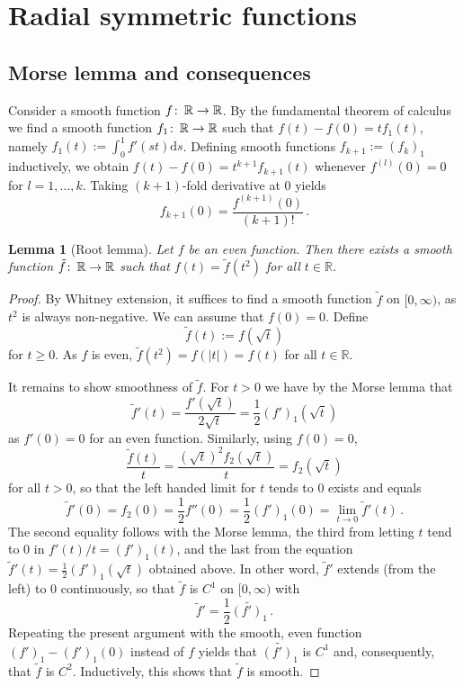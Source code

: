 \documentclass{amsart}
\newtheorem{lem}[prop]{Lemma}
\theoremstyle{definition}
\def\co{\colon\thinspace}
\newcommand{\rmd}{\mathrm d}
\newcommand{\R}{\mathbb R}
\newcommand{\ra}{\rightarrow}
\begin{document}
\section{Radial symmetric functions\label{sec:radsymmfcts}}




\subsection{Morse lemma and consequences\label{subsec:mlandcons}}


Consider a smooth function $f\co\R\ra\R$.
By the fundamental theorem of calculus
we find a smooth function $f_1\co\R\ra\R$
such that $f(t)-f(0)=tf_1(t)$,
namely $f_1(t):=\int_0^1f'(st)\rmd s$.
Defining smooth functions $f_{k+1}:=(f_k)_1$ inductively,
we obtain $f(t)-f(0)=t^{k+1}f_{k+1}(t)$
whenever $f^{(l)}(0)=0$ for $l=1,\ldots,k$.
Taking $(k+1)$-fold derivative at $0$ yields
\[
f_{k+1}(0)=\frac{f^{(k+1)}(0)}{(k+1)!}
\,.
\]


\begin{lem}[Root lemma]
\label{lem:rootlem}
Let $f$ be an even function.
Then there exists a smooth function $\tilde{f}\co\R\ra\R$
such that $f(t)=\tilde{f}(t^2)$ for all $t\in\R$.
\end{lem}


\begin{proof}
By Whitney extension,
it suffices to find a smooth function $\tilde{f}$ on $[0,\infty)$,
as $t^2$ is always non-negative.
We can assume that $f(0)=0$.
Define
\[
\tilde{f}(t):=f(\sqrt{t})
\]
for $t\geq0$.
As $f$ is even, $\tilde{f}(t^2)=f(|t|)=f(t)$ for all $t\in\R$.

It remains to show smoothness of $\tilde{f}$.
For $t>0$ we have by the Morse lemma that
\[
\tilde{f}'(t)
=\frac{f'(\sqrt{t})}{2\sqrt{t}}
=\frac12(f')_1(\sqrt{t})
\]
as $f'(0)=0$ for an even function.
Similarly, using $f(0)=0$,
\[
\frac{\tilde{f}(t)}{t}
=\frac{(\sqrt{t})^2f_2(\sqrt{t})}{t}
=f_2(\sqrt{t})
\]
for all $t>0$,
so that the left handed limit for $t$ tends to $0$
exists and equals
\[
\tilde{f}'(0)=f_2(0)=\frac12f''(0)=\frac12(f')_1(0)
=\lim_{t\ra0}\tilde{f}'(t)
\,.
\]
The second equality follows with the Morse lemma,
the third from letting $t$ tend to $0$ in $f'(t)/t=(f')_1(t)$,
and the last from the equation $\tilde{f}'(t)=\frac12(f')_1(\sqrt{t})$
obtained above.
In other word, $\tilde{f}'$ extends (from the left) to $0$ continuously,
so that $\tilde{f}$ is $C^1$ on $[0,\infty)$ with
\[
\tilde{f}'=\frac12\widetilde{(f')_1}
\,.
\]
Repeating the present argument with the smooth, even function
$(f')_1-(f')_1(0)$ instead of $f$ yields
that $\widetilde{(f')_1}$ is $C^1$ and, consequently,
that $\tilde{f}$ is $C^2$.
Inductively, this shows that $\tilde{f}$ is smooth.
\end{proof}
\end{document}
